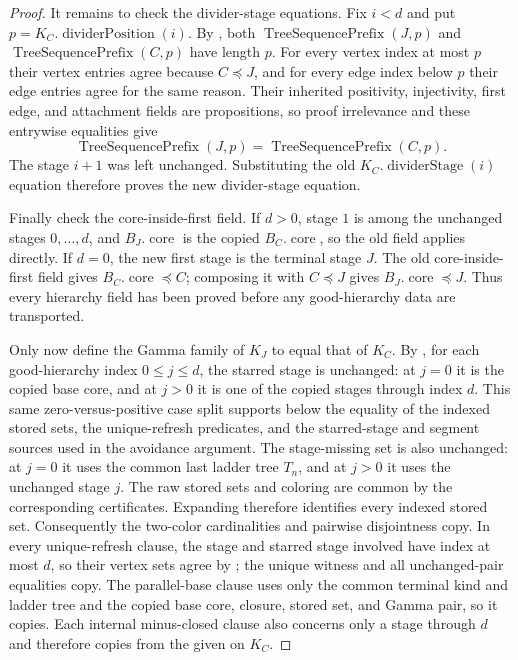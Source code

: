 \begin{proof}
It remains to check the divider-stage equations.  Fix $i<d$ and put
$p=K_C.\operatorname{dividerPosition}(i)$.  By
, both
$\operatorname{TreeSequencePrefix}(J,p)$ and
$\operatorname{TreeSequencePrefix}(C,p)$ have length $p$.  For every
vertex index at most $p$ their vertex entries agree because
$C\preccurlyeq J$, and for every edge index below $p$ their edge entries
agree for the same reason.  Their inherited positivity, injectivity, first
edge, and attachment fields are propositions, so proof irrelevance and
these entrywise equalities give
\[
 \operatorname{TreeSequencePrefix}(J,p)
   =\operatorname{TreeSequencePrefix}(C,p).
\]
The stage $i+1$ was left unchanged.  Substituting the old
$K_C.\operatorname{dividerStage}(i)$ equation therefore proves the new
divider-stage equation.

Finally check the core-inside-first field.  If $d>0$, stage $1$ is among
the unchanged stages $0,\ldots,d$, and $B_J.\operatorname{core}$ is the
copied $B_C.\operatorname{core}$, so the old field applies directly.  If
$d=0$, the new first stage is the terminal stage $J$.  The old
core-inside-first field gives
$B_C.\operatorname{core}\preccurlyeq C$; composing it with
$C\preccurlyeq J$ gives
$B_J.\operatorname{core}\preccurlyeq J$.  Thus every hierarchy field has
been proved before any good-hierarchy data are transported.

Only now define the Gamma family of $K_J$ to equal that of $K_C$.  By
, for each good-hierarchy index
$0\leq j\leq d$, the starred stage is unchanged: at $j=0$ it is the copied
base core, and at $j>0$ it is one of the copied stages through index $d$.
This same zero-versus-positive case split supports below the equality of
the indexed stored sets, the unique-refresh predicates, and the
starred-stage and segment sources used in the avoidance argument.  The
stage-missing set is also unchanged: at
$j=0$ it uses the common last ladder tree $T_n$, and at $j>0$ it uses the
unchanged stage $j$.  The raw stored sets and coloring are common by the
corresponding certificates.  Expanding
 therefore identifies every indexed
stored set.  Consequently the two-color cardinalities and pairwise
disjointness copy.  In every unique-refresh clause, the stage and starred
stage involved have index at most $d$, so their vertex sets agree by
; the unique witness and all unchanged-pair
equalities copy.  The parallel-base clause uses only the common terminal
kind and ladder tree and the copied base core, closure, stored set, and
Gamma pair, so it copies.  Each internal minus-closed clause also concerns
only a stage through $d$ and therefore copies from the given
 on $K_C$.


\end{proof}
